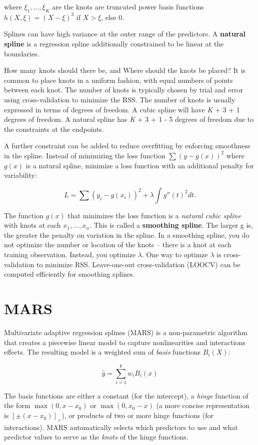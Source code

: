 \documentclass[]{book}
\begin{document}
where \(\xi_1, \dots, \xi_K\) are the knots are truncated power basis functions \(h(X, \xi) = (X - \xi)^3\) if \(X > \xi\), else 0.

Splines can have high variance at the outer range of the predictors. A \textbf{natural spline} is a regression spline additionally constrained to be linear at the boundaries.

How many knots should there be, and Where should the knots be placed? It is common to place knots in a uniform fashion, with equal numbers of points between each knot. The number of knots is typically chosen by trial and error using cross-validation to minimize the RSS. The number of knots is usually expressed in terms of degrees of freedom. A cubic spline will have \emph{K} + 3 + 1 degrees of freedom. A natural spline has \emph{K} + 3 + 1 - 5 degrees of freedom due to the constraints at the endpoints.

A further constraint can be added to reduce overfitting by enforcing smoothness in the spline. Instead of minimizing the loss function \(\sum{(y - g(x))^2}\) where \(g(x)\) is a natural spline, minimize a loss function with an additional penalty for variability:

\[L = \sum{(y_i - g(x_i))^2 + \lambda \int g''(t)^2dt}.\]

The function \(g(x)\) that minimizes the loss function is a \emph{natural cubic spline} with knots at each \(x_1, \dots, x_n\). This is called a \textbf{smoothing spline}. The larger g is, the greater the penalty on variation in the spline. In a smoothing spline, you do not optimize the number or location of the knots -- there is a knot at each training observation. Instead, you optimize \(\lambda\). One way to optimze \(\lambda\) is cross-validation to minimize RSS. Leave-one-out cross-validation (LOOCV) can be computed efficiently for smoothing splines.

\hypertarget{mars}{%
\section{MARS}\label{mars}}

Multivariate adaptive regression splines (MARS) is a non-parametric algorithm that creates a piecewise linear model to capture nonlinearities and interactions effects. The resulting model is a weighted sum of \emph{basis} functions \(B_i(X)\):

\[\hat{y} = \sum_{i=1}^{k}{w_iB_i(x)}\]

The basis functions are either a constant (for the intercept), a \emph{hinge} function of the form \(\max(0, x - x_0)\) or \(\max(0, x_0 - x)\) (a more concise representation is \([\pm(x - x_0)]_+\)), or products of two or more hinge functions (for interactions). MARS automatically selects which predictors to use and what predictor values to serve as the \emph{knots} of the hinge functions.
\end{document}
